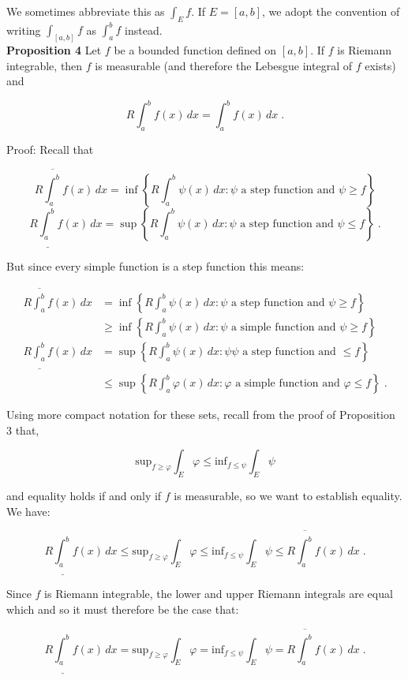 \documentclass[a4paper]{article}
\begin{document}
We sometimes abbreviate this as $\int_E f$. If $E = [a,b]$, we adopt the convention of writing $\int_{[a,b]} f$ as $\int_a^b f$ instead. \\

{\bf Proposition 4} Let $f$ be a bounded function defined on $[a,b]$. If $f$ is Riemann integrable, then $f$ is measurable (and therefore the Lebesgue integral of $f$ exists) and 

$$R\int_a^b f(x) \, dx = \int_a^b f(x) \, dx \;.$$ 

Proof: Recall that

$$R\overline{\int_a^b} f(x) \, dx = \inf \left\{R \int_a^b \psi(x) \, dx : \psi \text{ a step function and } \psi \geq f\right\}$$
$$R\underline{\int_a^b} f(x) \, dx  = \sup \left\{R \int_a^b \psi(x) \, dx :  \psi \text{ a step function and } \psi \leq f\right\} \;.$$

But since every simple function is a step function this means:

\begin{align*}
R\overline{\int_a^b} f(x) \, dx &= \inf \left\{R \int_a^b \psi(x) \, dx : \psi \text{ a step function and } \psi \geq f\right\}\\
& \geq \inf \left\{R \int_a^b \psi(x) \, dx : \psi \text{ a simple function and } \psi \geq f\right\}\\
R\underline{\int_a^b} f(x) \, dx  &= \sup \left\{R \int_a^b \psi(x) \, dx : \psi  \psi \text{ a step function and } \leq f\right\}\\
& \leq \sup \left\{R \int_a^b \varphi(x) \, dx :   \varphi \text{ a simple function and } \varphi \leq f\right\} \;.
\end{align*} 

Using more compact notation for these sets, recall from the proof of Proposition 3 that, 

$$\text{sup}_{f\geq \varphi} \int_E \varphi \leq\text{inf}_{f\leq \psi} \int_E \psi $$

and equality holds if and only if $f$ is measurable, so we want to establish equality. We have:

$$ R\underline{\int_a^b} f(x) \, dx \leq \text{sup}_{f\geq \varphi} \int_E \varphi \leq \text{inf}_{f\leq \psi} \int_E \psi \leq R\overline{\int_a^b} f(x) \, dx \;.$$

Since $f$ is Riemann integrable, the lower and upper Riemann integrals are equal which and so it must therefore be the case that:

$$ R\underline{\int_a^b} f(x) \, dx = \text{sup}_{f\geq \varphi} \int_E \varphi = \text{inf}_{f\leq \psi} \int_E \psi = R\overline{\int_a^b} f(x) \, dx \;.$$
\end{document}
